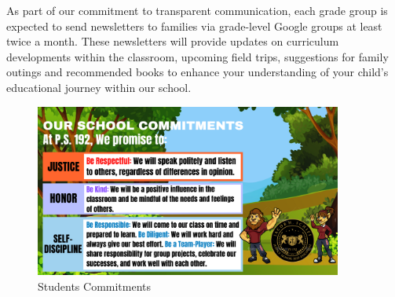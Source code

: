 \documentclass[letterpaper, 11pt]{article}
\begin{document}
As part of our commitment to transparent communication, each grade group is expected to send newsletters to families via grade-level Google groups at least twice a month. These newsletters will provide updates on curriculum developments within the classroom, upcoming field trips, suggestions for family outings and recommended books to enhance your understanding of your child's educational journey within our school.

\begin{figure}[H]
  \centering
  \includegraphics[width=0.9\textwidth]{commitments1}
  \caption{Students Commitments}
  \label{fig:Growth}
\end{figure}

\pagebreak
\end{document}
